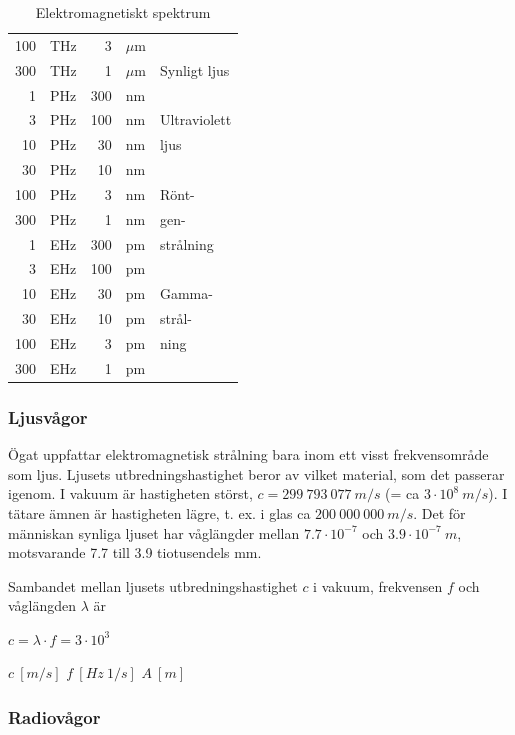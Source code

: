 \begin{table}
\begin{center}
\begin{tabular}{|rl|rl|l|}
100 & THz &   3 & \(\mu\)m & \\ \cline{5-5}
300 & THz &   1 & \(\mu\)m & Synligt ljus \\ \cline{5-5}
  1 & PHz & 300 & nm & \\
  3 & PHz & 100 & nm & Ultraviolett \\
 10 & PHz &  30 & nm & ljus \\ \cline{5-5}
 30 & PHz &  10 & nm & \\
100 & PHz &   3 & nm & Rönt-\\
300 & PHz &   1 & nm & gen-\\
  1 & EHz & 300 & pm & strålning\\ \cline{5-5}
  3 & EHz & 100 & pm & \\
 10 & EHz &  30 & pm & Gamma-\\
 30 & EHz &  10 & pm & strål-\\
100 & EHz &   3 & pm & ning\\
300 & EHz &   1 & pm & \\
\hline
\end{tabular}
\end{center}
\caption{Elektromagnetiskt spektrum}
\label{tab:elektromagnetiskt_spektrum}
\end{table}

\subsubsection{Ljusvågor}

Ögat uppfattar elektromagnetisk strålning bara inom ett visst frekvensområde
som ljus. Ljusets utbredningshastighet beror av vilket material, som det
passerar igenom. I vakuum är hastigheten störst, \(c = 299\ 793\ 077\ m/s\)
(= ca \(3 \cdot 10^8\ m/s\)). I tätare ämnen är hastigheten lägre, t. ex. i
glas ca \(200\ 000\ 000\ m/s\). Det för människan synliga ljuset har
våglängder mellan \(7.7 \cdot 10^{-7}\) och \(3.9 \cdot 10^{-7}\ m\), motsvarande
7.7 till 3.9 tiotusendels mm.

Sambandet mellan ljusets utbredningshastighet \(c\) i vakuum, frekvensen \(f\)
och våglängden \(\lambda\) är

\(c = \lambda \cdot f = 3 \cdot 10^3\)

\(c\ [m/s]\) \(f\ [Hz\ 1/s]\) \(A\ [m]\)

\subsubsection{Radiovågor}


